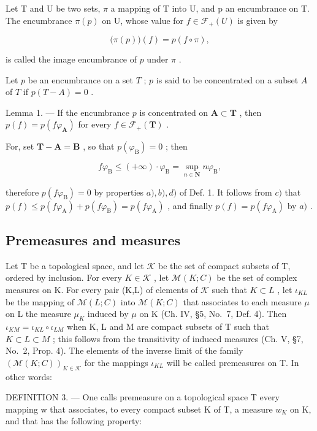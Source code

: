 Let T and U be two sets, \(\pi\) a mapping of T into U, and p an encumbrance on T. The encumbrance \(\pi(p)\) on U, whose value for \(f \in \mathcal{F}_{+}(U)\) is given by

\[
\bigl (\pi (p) \bigr) (f) = p (f \circ \pi),
\]

is called the image encumbrance of \(p\) under \(\pi\) .

Let \(p\) be an encumbrance on a set \(T\) ; \(p\) is said to be concentrated on a subset \(A\) of \(T\) if \(p(T - A) = 0\) .

Lemma 1. --- If the encumbrance \(p\) is concentrated on \(\mathbf{A} \subset \mathbf{T}\) , then \(p(f) = p(f\varphi_{\mathbf{A}})\) for every \(f \in \mathcal{F}_{+}(\mathbf{T})\) .

For, set \(\mathbf{T} - \mathbf{A} = \mathbf{B}\) , so that \(p(\varphi_{\mathrm{B}}) = 0\) ; then

\[
f \varphi_ {\mathrm{B}} \leqslant (+ \infty) \cdot \varphi_ {\mathrm{B}} = \sup _ {n \in \mathbf {N}} n \varphi_ {\mathrm{B}},
\]

therefore \(p(f\varphi_{\mathrm{B}}) = 0\) by properties \(a), b), d)\) of Def. 1. It follows from \(c)\) that \(p(f) \leqslant p(f\varphi_{\mathrm{A}}) + p(f\varphi_{\mathrm{B}}) = p(f\varphi_{\mathrm{A}})\) , and finally \(p(f) = p(f\varphi_{\mathrm{A}})\) by \(a)\) .

\subsection{Premeasures and measures}

Let T be a topological space, and let \(\mathcal{K}\) be the set of compact subsets of T, ordered by inclusion. For every \(K\in\mathcal{K}\) , let \(\mathcal{M}(K;C)\) be the set of complex measures on K. For every pair (K,L) of elements of \(\mathcal{K}\) such that \(K\subset L\) , let \(\iota_{KL}\) be the mapping of \(\mathcal{M}(L;C)\) into \(\mathcal{M}(K;C)\) that associates to each measure \(\mu\) on L the measure \(\mu_{K}\) induced by \(\mu\) on K (Ch. IV, §5, No.~7, Def. 4). Then \(\iota_{KM}=\iota_{KL}\circ\iota_{LM}\) when K, L and M are compact subsets of T such that \(K\subset L\subset M\) ; this follows from the transitivity of induced measures (Ch. V, §7, No.~2, Prop. 4). The elements of the inverse limit of the family \((\mathcal{M}(K;C))_{K\in\mathcal{K}}\) for the mappings \(\iota_{KL}\) will be called premeasures on T. In other words:

DEFINITION 3. --- One calls premeasure on a topological space T every mapping w that associates, to every compact subset K of T, a measure \(w_{K}\) on K, and that has the following property:

